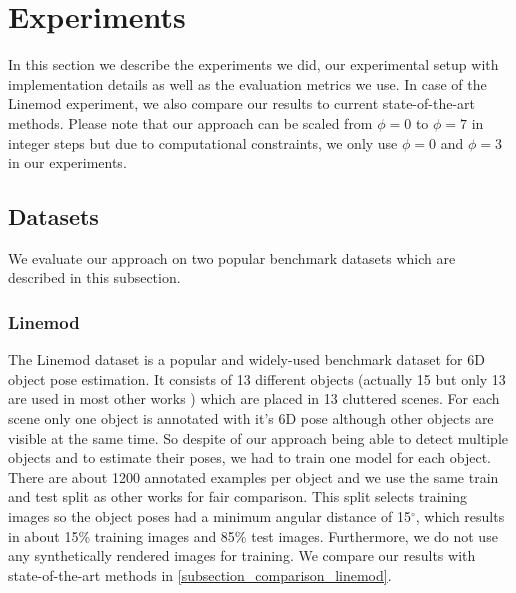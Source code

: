 \documentclass[twocolumn, 10pt, letterpaper]{article}
\begin{document}
\section{Experiments}
\label{section_experiments}
In this section we describe the experiments we did, our experimental setup with implementation details as well as the evaluation metrics we use. In case of the Linemod experiment, we also compare our results to current state-of-the-art methods. Please note that our approach can be scaled from $\phi = 0$ to $\phi = 7$ in integer steps but due to computational constraints, we only use $\phi = 0$ and $\phi = 3$ in our experiments.

\subsection{Datasets}
\label{subsection_datasets}
We evaluate our approach on two popular benchmark datasets which are described in this subsection.

\subsubsection{Linemod}
\label{subsubsection_linemod}
The Linemod\cite{Linemod} dataset is a popular and widely-used benchmark dataset for 6D object pose estimation. It consists of 13 different objects (actually 15 but only 13 are used in most other works \cite{YOLO6D}\cite{Pix2Pose}\cite{PVNet}\cite{DPOD}\cite{CDPN}\cite{HybridPose}) which are placed in 13 cluttered scenes. For each scene only one object is annotated with it's 6D pose although other objects are visible at the same time. So despite of our approach being able to detect multiple objects and to estimate their poses, we had to train one model for each object. There are about 1200 annotated examples per object and we use the same train and test split as other works \cite{Linemod_train_test_split}\cite{PVNet}\cite{YOLO6D} for fair comparison. This split selects training images so the object poses had a minimum angular distance of 15$^\circ$, which results in about 15\% training images and 85\% test images. Furthermore, we do not use any synthetically rendered images for training. We compare our results with state-of-the-art methods in \autoref{subsection_comparison_linemod}.
\end{document}
